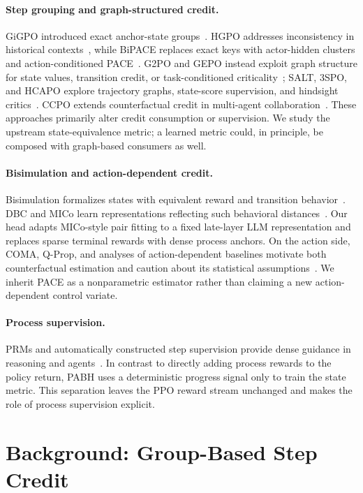\documentclass[10pt,twocolumn,letterpaper]{article}
\newcommand{\method}{PABH\xspace}
\begin{document}
\paragraph{Step grouping and graph-structured credit.}
GiGPO introduced exact anchor-state groups~\cite{gigpo}. HGPO addresses inconsistency in historical contexts~\cite{hgpo}, while BiPACE replaces exact keys with actor-hidden clusters and action-conditioned PACE~\cite{bipace}. G2PO and GEPO instead exploit graph structure for state values, transition credit, or task-conditioned criticality~\cite{g2po,gepo}; SALT, 3SPO, and HCAPO explore trajectory graphs, state-score supervision, and hindsight critics~\cite{salt,three_spo,hcapo}. CCPO extends counterfactual credit in multi-agent collaboration~\cite{ccpo}. These approaches primarily alter credit consumption or supervision. We study the upstream state-equivalence metric; a learned metric could, in principle, be composed with graph-based consumers as well.

\paragraph{Bisimulation and action-dependent credit.}
Bisimulation formalizes states with equivalent reward and transition behavior~\cite{givan,ferns}. DBC and MICo learn representations reflecting such behavioral distances~\cite{dbc,mico}. Our head adapts MICo-style pair fitting to a fixed late-layer LLM representation and replaces sparse terminal rewards with dense process anchors. On the action side, COMA, Q-Prop, and analyses of action-dependent baselines motivate both counterfactual estimation and caution about its statistical assumptions~\cite{coma,qprop,mirage}. We inherit PACE as a nonparametric estimator rather than claiming a new action-dependent control variate.

\paragraph{Process supervision.}
PRMs and automatically constructed step supervision provide dense guidance in reasoning and agents~\cite{prm,mathshepherd,pqm,edu_prm,istar,turn_reward}. In contrast to directly adding process rewards to the policy return, \method uses a deterministic progress signal only to train the state metric. This separation leaves the PPO reward stream unchanged and makes the role of process supervision explicit.

\section{Background: Group-Based Step Credit}
\label{sec:background}
\end{document}
